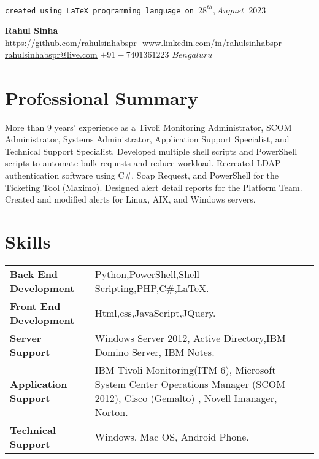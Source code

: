 \documentclass[letterpaper, 10pt]{article}
\begin{document}
	
	\begin{flushright}
		\texttt{created using {\LaTeX} programming language on $28^{th}$$,{August}$ $2023$}
	\end{flushright}
	
	\begin{center}
		\textbf{\Huge Rahul Sinha} \\ \vspace{4pt}
		\href{https://github.com/rahulsinhabspr}{\underline{https://github.com/rahulsinhabspr}} $  $
		\href{www.linkedin.com/in/rahulsinhabspr}{\underline{www.linkedin.com/in/rahulsinhabspr}} $  $
		\href{mailto:rahulsinhabspr@live.com}
		{\underline{rahulsinhabspr@live.com}}
		\newline
		{$\underline{+91-7401361223}$}
		{$\underline{Bengaluru}$}
	\end{center}
	\section*{Professional Summary} 
	
			More than 9 years' experience as a Tivoli Monitoring Administrator, SCOM Administrator, Systems Administrator, Application Support Specialist, and Technical Support Specialist. Developed multiple shell scripts and PowerShell scripts to automate bulk requests and reduce workload. Recreated LDAP authentication software using C\#, Soap Request, and PowerShell for the Ticketing Tool (Maximo). Designed alert detail reports for the Platform Team. Created and modified alerts for Linux, AIX, and Windows servers. 
	
	\section*{Skills}
	\begin{tabular}{ m{}  m{}  } 
		
		\textbf{Back End Development} & Python,PowerShell,Shell Scripting,PHP,C\#,\LaTeX.  \\ 
		\textbf{Front End Development} & Html,css,JavaScript,JQuery. \\
		\textbf{Server Support} & Windows Server 2012, Active Directory,IBM Domino Server, IBM Notes. \\
		\textbf{Application Support} & IBM Tivoli Monitoring(ITM 6), Microsoft System Center Operations Manager (SCOM 2012), Cisco (Gemalto) , Novell Imanager, Norton. \\ 
		\textbf{Technical Support} & Windows, Mac OS, Android Phone. \\ 
		
	\end{tabular}
\end{document}
